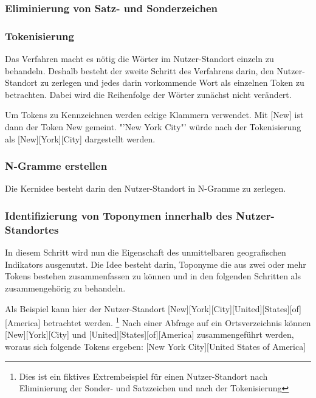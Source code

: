 		  	\subsubsection{Eliminierung von Satz- und Sonderzeichen}

			  	

			\subsubsection{Tokenisierung}

				Das Verfahren macht es nötig die Wörter im Nutzer-Standort einzeln zu behandeln. 
				Deshalb besteht der zweite Schritt des Verfahrens darin, den Nutzer-Standort zu zerlegen und jedes darin vorkommende Wort als einzelnen Token zu betrachten. 
				Dabei wird die Reihenfolge der Wörter zunächst nicht verändert.

				Um Tokens zu Kennzeichnen werden eckige Klammern verwendet.  
				Mit [New] ist dann der Token New gemeint. 
				"'New York City"' würde nach der Tokenisierung als [New][York][City] dargestellt werden. 


			\subsubsection{N-Gramme erstellen}

				Die Kernidee besteht darin den Nutzer-Standort in N-Gramme zu zerlegen. 


		  	\subsubsection{Identifizierung von Toponymen innerhalb des Nutzer-Standortes}
		  		
		  		In diesem Schritt wird nun die Eigenschaft des unmittelbaren geografischen Indikators ausgenutzt.
		  		Die Idee besteht darin, Toponyme die aus zwei oder mehr Tokens bestehen zusammenfassen zu können und in den folgenden Schritten als zusammengehörig zu behandeln.

		  		Als Beispiel kann hier der Nutzer-Standort [New][York][City][United][States][of][America] betrachtet werden. \footnote{Dies ist ein fiktives Extrembeispiel für einen Nutzer-Standort nach Eliminierung der Sonder- und Satzzeichen und nach der Tokenisierung}
		  		Nach einer Abfrage auf ein Ortsverzeichnis können [New][York][City] und [United][States][of][America] zusammengeführt werden, woraus sich folgende Tokens ergeben:
		  		[New York City][United States of America]   

